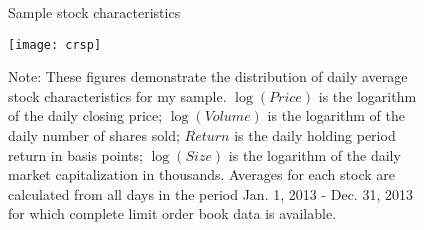 \clearpage

\begin{figure}[ht!]
\small
\linespread{1}
\centering
\captionsetup{labelsep=colon, font=footnotesize, justification=centerfirst, width=\linewidth}
\caption{Sample stock characteristics}
\label{fig:crsp}
\texttt{[image: crsp]}
\captionsetup{position=below, font=footnotesize, justification=justified, width=\linewidth}
\caption*{Note: These figures demonstrate the distribution of daily average stock characteristics for my sample. $\log(Price)$ is the logarithm of the daily closing price; $\log(Volume)$ is the logarithm of the daily number of shares sold; $Return$ is the daily holding period return in basis points; $\log(Size)$ is the logarithm of the daily market capitalization in thousands. Averages for each stock  are calculated from all days in the period Jan. 1, 2013 - Dec. 31, 2013 for which complete limit order book data is available.}
\end{figure}


